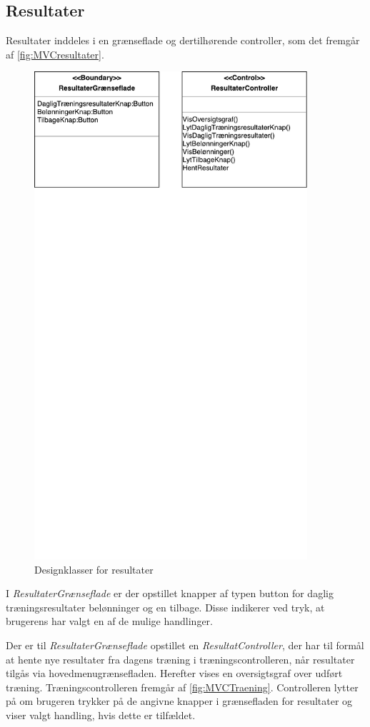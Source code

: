 \subsection{Resultater}
Resultater inddeles i en grænseflade og dertilhørende controller, som det fremgår af \autoref{fig:MVCresultater}. 

\begin{figure} [H]
\centering
\includegraphics[width=0.9\textwidth]{figures/MVC/Resultater}
\caption{Designklasser for resultater}
\label{fig:MVCresultater}
\end{figure}

\noindent
I \textit{ResultaterGrænseflade} er der opstillet knapper af typen button for daglig træningsresultater belønninger og en tilbage. Disse indikerer ved tryk, at brugerens har valgt en af de mulige handlinger. 
 
Der er til \textit{ResultaterGrænseflade} opstillet en \textit{ResultatController}, der har til formål at hente nye resultater fra dagens træning i træningscontrolleren, når resultater tilgås via hovedmenugrænsefladen. Herefter vises en oversigtsgraf over udført træning. Træningscontrolleren fremgår af \autoref{fig:MVCTraening}.
Controlleren lytter på om brugeren trykker på de angivne knapper i grænsefladen for resultater og viser valgt handling, hvis dette er tilfældet. 
